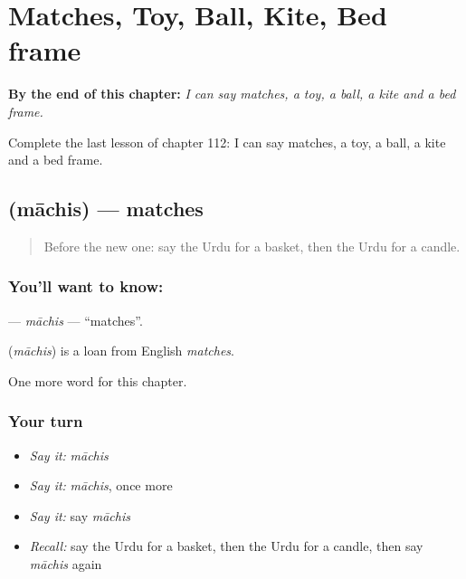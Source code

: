 
\chapter{Matches, Toy, Ball, Kite, Bed frame}
\label{ch:ur-matches-toy-ball-kite-bed-frame}

\begin{chapteropening}
\textbf{By the end of this chapter:} \emph{I can say matches, a toy, a ball, a kite and a bed frame.}

Complete the last lesson of chapter 112: I can say matches, a toy, a ball, a kite and a bed frame.
\end{chapteropening}

\section[\texorpdfstring{\ur{ماچس} (māchis)}{ماچس (māchis)}]{ (māchis) — matches}

\label{lesson:UR-C112-machis}



\begin{quote}
Before the new one: say the Urdu for a basket, then the Urdu for a candle.
\end{quote}

\subsection*{You'll want to know: }
\textbf{} — \emph{māchis} — \textquotedblleft{}matches\textquotedblright{}.

\begin{cousinweb}
\textbf{} (\emph{māchis}) is a loan from English \emph{matches}.
\end{cousinweb}

\begin{grammarlens}[title={What you've built}]
One more word for this chapter.
\end{grammarlens}

\subsection*{Your turn}
\begin{itemize}
\raggedright
  \item \emph{Say it:} \emph{māchis}
  \item \emph{Say it:} \emph{māchis}, once more
  \item \emph{Say it:} say \emph{māchis}
  \item \emph{Recall:} say the Urdu for a basket, then the Urdu for a candle, then say \emph{māchis} again
\end{itemize}

